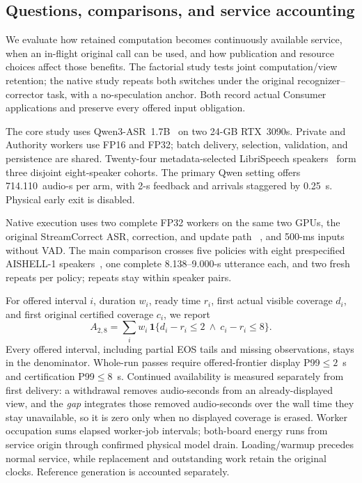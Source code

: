 \subsection{Questions, comparisons, and service accounting}
We evaluate how retained computation becomes continuously available
service, when an in-flight original call can be used, and how publication
and resource choices affect those benefits. The factorial study tests
joint computation/view retention; the native study repeats both switches
under the original recognizer--corrector task, with a no-speculation
anchor. Both record
actual Consumer applications and preserve every offered input obligation.

The core study uses Qwen3-ASR~1.7B~\cite{shi2026qwen3asr} on two 24-GB
RTX~3090s. Private and Authority workers use FP16 and FP32; batch delivery,
selection, validation, and persistence are shared. Twenty-four
metadata-selected LibriSpeech speakers~\cite{panayotov2015librispeech}
form three disjoint eight-speaker cohorts. The primary Qwen setting
offers 714.110~audio-s per arm, with 2-s feedback and arrivals staggered
by 0.25~s. Physical early exit is disabled.

Native execution uses two complete FP32 workers on the same two GPUs,
the original StreamCorrect ASR, correction, and update path
~\cite{vu2026streamcorrect}, and 500-ms inputs without VAD. The main
comparison crosses five policies with eight prespecified AISHELL-1
speakers~\cite{bu2017aishell}, one complete 8.138--9.000-s utterance each,
and two fresh repeats per policy; repeats stay within speaker pairs.

For offered interval $i$, duration $w_i$, ready time $r_i$, first actual
visible coverage $d_i$, and first original certified coverage $c_i$, we
report
\begin{equation}
 A_{2,8}=\sum_i w_i\,\mathbf{1}
 \{d_i-r_i\leq2\ \land\ c_i-r_i\leq8\}.
 \label{eq:credit}
\end{equation}
Every offered interval, including partial EOS tails and missing
observations, stays in the denominator. Whole-run passes require
offered-frontier display P99$\leq2$~s and certification P99$\leq8$~s.
Continued availability is measured separately from first delivery: a
withdrawal removes audio-seconds from an already-displayed view, and
the \emph{gap} integrates those removed audio-seconds over the wall
time they stay unavailable, so it is zero only when no displayed
coverage is erased.
Worker occupation sums elapsed worker-job intervals; both-board energy
runs from service origin through confirmed physical model drain.
Loading/warmup precedes normal service, while replacement and outstanding
work retain the original clocks. Reference generation is accounted
separately.

